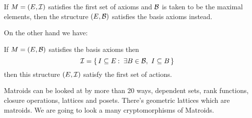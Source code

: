 \documentclass[12pt]{memoir}
\begin{document}
\begin{Lem}
    If $M=(E,\mathcal{I})$ satisfies the first set of axioms and $\mathcal{B}$ is taken to be the maximal elements, then the structure $(E,\mathcal{B})$ satisfies the basis axioms instead.
\end{Lem}

On the other hand we have:

\begin{Lem}
    If $M=(E,\mathcal{B})$ satisfies the basis axioms then 
    $$\cI=\set{I\subseteq E\:\ \exists B\in\cB,\ I\subseteq B}$$
    then this structure $(E,\mathcal{I})$ satisfy the first set of actions.
\end{Lem}

Matroids can be looked at by more than 20 ways, dependent sets, rank functions, closure operations, lattices and posets. There's geometric lattices which are matroids. We are going to look a many cryptomorphisms of Matroids. 
\ifx\nextra\undefined
\printindex
\else\fi
\nocite{*}


\end{document}
